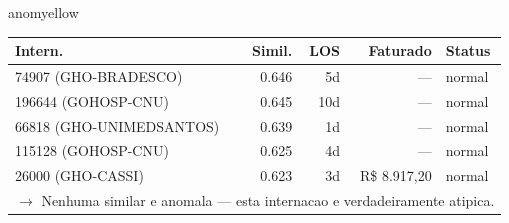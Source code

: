\documentclass[a4paper,10pt]{article}
\begin{document}
\begin{anomalycard}[Internacao 184503 | PASA | MODERADO (z=2.21)]{anomyellow}
\begin{tabular}{l r r r l}\toprule\textbf{Intern.} & \textbf{Simil.} & \textbf{LOS} & \textbf{Faturado} & \textbf{Status} \\\midrule
74907 (GHO-BRADESCO) & 0.646 & 5d & --- & \textcolor{jcubeblue}{normal} \\
196644 (GOHOSP-CNU) & 0.645 & 10d & --- & \textcolor{jcubeblue}{normal} \\
66818 (GHO-UNIMEDSANTOS) & 0.639 & 1d & --- & \textcolor{jcubeblue}{normal} \\
115128 (GOHOSP-CNU) & 0.625 & 4d & --- & \textcolor{jcubeblue}{normal} \\
26000 (GHO-CASSI) & 0.623 & 3d & R\$ 8.917,20 & \textcolor{jcubeblue}{normal} \\
\multicolumn{5}{l}{\textcolor{jcubeblue}{\small $\rightarrow$ Nenhuma similar e anomala --- esta internacao e verdadeiramente atipica.}} \\
\bottomrule\end{tabular}


\end{anomalycard}

\newpage
\end{document}
